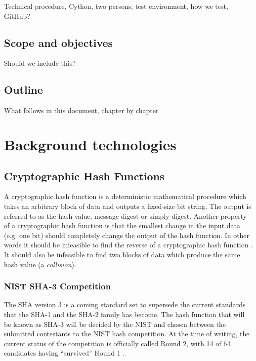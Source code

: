 \documentclass[english,12pt,a4paper]{book}
\begin{document}
Technical procedure, Cython, two persons, test environment, how we test,
GitHub?

\section{Scope and objectives}

Should we include this?

\section{Outline}

What follows in this document, chapter by chapter

\chapter{Background technologies}

\section{Cryptographic Hash Functions}

A cryptographic hash function is a deterministic mathematical procedure which
takes an arbitrary block of data and outputs a fixed-size bit string. The output
is referred to as the hash value, message digest or simply digest.
Another property of a cryptographic hash function is that the smallest change in
the input data (e.g. one bit) should completely change the output of the hash
function. In other words it should be infeasible to find the reverse of a
cryptographic hash function \cite[p. 335]{stallings}. It should also be infeasible to
find two blocks of data which produce the same hash value (a \emph{collision}).

\subsection{NIST SHA-3 Competition}
The \ac{SHA} version 3 is a coming standard set to supersede the current
standards that the \ac{SHA}-1 and the \ac{SHA}-2 family has become. The hash
function that will be known as \ac{SHA}-3 will be decided by the \ac{NIST} and
chosen between the submitted contestants to the \ac{NIST} hash competition.
At the time of writing, the current status of the competition is officially
called Round 2, with 14 of 64 candidates having ``survived'' Round 1
\cite{s_fedreg}.
\end{document}
